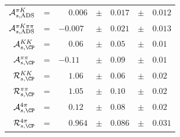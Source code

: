 \begin{center}
\begin{tabular}{rclclcl}
$\mathcal{A}_{s,\rm ADS}^{\pi K}$ &= & $\phantom{+}0.006$ & $\pm$ & $0.017$ & $\pm$ & $0.012$ \\
$\mathcal{A}_{s,\rm ADS}^{\pi K\pi\pi}$ &= & $-0.007$ & $\pm$ & $0.021$ & $\pm$ & $0.013$ \\
$\mathcal{A}_{s,\CP}^{KK}$ &= & $\phantom{+}0.06$ & $\pm$ & $0.05$ & $\pm$ & $0.01$ \\
$\mathcal{A}_{s,\CP}^{\pi\pi}$ &= & $-0.11$ & $\pm$ & $0.09$ & $\pm$ & $0.01$ \\
$\mathcal{R}_{s,\CP}^{KK}$ &= & $\phantom{+}1.06$ & $\pm$ & $0.06$ & $\pm$ & $0.02$ \\
$\mathcal{R}_{s,\CP}^{\pi\pi}$ &= & $\phantom{+}1.05$ & $\pm$ & $0.10$ & $\pm$ & $0.02$ \\
$\mathcal{A}_{s,\CP}^{4\pi}$ &= & $\phantom{+}0.12$ & $\pm$ & $0.08$ & $\pm$ & $0.02$ \\
$\mathcal{R}_{s,\CP}^{4\pi}$ &= & $\phantom{+}0.964$ & $\pm$ & $0.086$ & $\pm$ & $0.031$ \\
\end{tabular}
\end{center}
